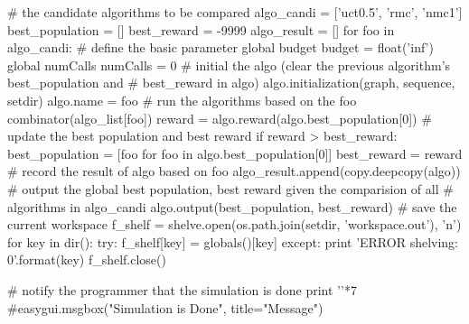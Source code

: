 \documentclass{article}
\begin{document}
\begin{python}[moreemph={[4]42},caption={A General Framework of MCTS based on Python},label=ex1]
    # the candidate algorithms to be compared
    algo_candi = ['uct0.5', 'rmc', 'nmc1']
    best_population = []
    best_reward = -9999
    algo_result = []
    for foo in algo_candi:
        # define the basic parameter
        global budget
        budget = float('inf')
        global numCalls
        numCalls = 0        
        # initial the algo (clear the previous algorithm's best_population and
        # best_reward in algo)
        algo.initialization(graph, sequence, setdir)
        algo.name = foo
        # run the algorithms based on the foo
        combinator(algo_list[foo])
        reward = algo.reward(algo.best_population[0])
        # update the best population and best reward
        if reward > best_reward:
            best_population = [foo for foo in algo.best_population[0]]
            best_reward = reward
        # record the result of algo based on foo
        algo_result.append(copy.deepcopy(algo))
    # output the global best population, best reward given the comparision of all
    # algorithms in algo_candi
    algo.output(best_population, best_reward)
    # save the current workspace 
    f_shelf = shelve.open(os.path.join(setdir, 'workspace.out'), 'n')
    for key in dir():
        try:
            f_shelf[key] = globals()[key]
        except:
            print 'ERROR shelving: {0}'.format(key)
    f_shelf.close()
    
    # notify the programmer that the simulation is done
    print '\a'*7
    #easygui.msgbox("Simulation is Done", title="Message")
\end{python}
\end{document}

